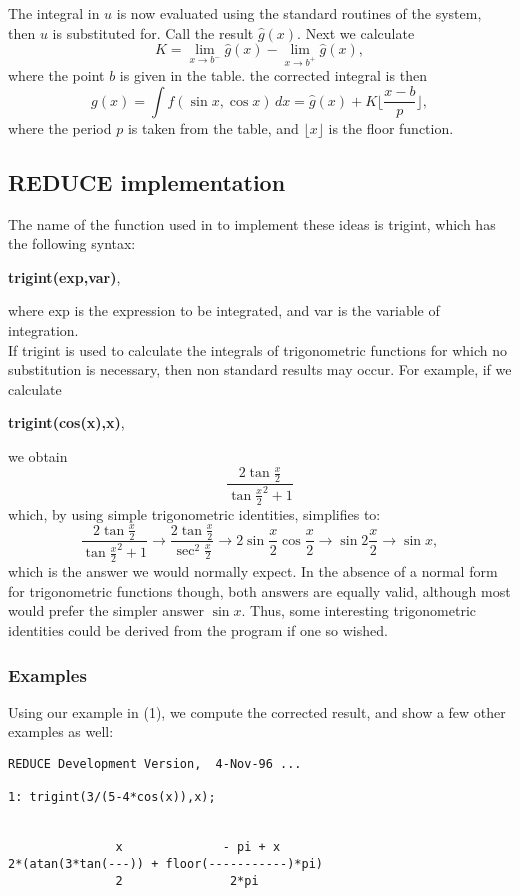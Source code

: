 The integral in $u$ is now evaluated using the standard routines of the system, then $u$ is substituted for. Call the result $\hat{g}(x)$. Next we calculate
 \[ K=\lim_{x \rightarrow b^{-}} \hat{g}(x) - \lim_{x \rightarrow b^{+}} \hat{g}(x), \]
where the point $b$ is given in the table. the corrected integral is then
\[ g(x)=\int f(\sin x,\cos x)\,dx = \hat{g}(x)+K\lfloor \frac{x-b}{p} \rfloor, \]
where the period $p$ is taken from the table, and $\lfloor x \rfloor$ is the floor function.

\subsection{REDUCE implementation}
The name of the function used in \REDUCE to implement these ideas is trigint, which has the following syntax:
\begin{center}  \textbf{trigint(exp,var)}, \end{center}
where exp is the expression to be integrated, and var is the variable of integration.  \\
If trigint is used to calculate the integrals of trigonometric functions for which no substitution is necessary, then non standard results may occur. For example, if we calculate
  \begin{center} \textbf{trigint(cos(x),x)}, \end{center}
we obtain
\[ \frac{2\tan\frac{x}{2}}{\tan\frac{x}{2}^{2}+1} \]
which, by using simple trigonometric identities, simplifies to:
\[  \frac{2\tan\frac{x}{2}}{\tan\frac{x}{2}^{2}+1} \rightarrow \frac{2\tan\frac{x}{2}}{\sec^{2}\frac{x}{2}} \rightarrow 2\sin\frac{x}{2}\cos\frac{x}{2} \rightarrow \sin 2\frac{x}{2} \rightarrow \sin x, \]
which is the answer we would normally expect. In the absence of a normal form for trigonometric functions though, both answers are equally valid, although most would prefer the simpler answer $\sin x$. Thus, some interesting trigonometric identities could be derived from the program if one so wished.
\subsubsection{Examples}
Using our example in (1), we compute the corrected result, and show a few other examples as well:
\begin{verbatim}
REDUCE Development Version,  4-Nov-96 ...

1: trigint(3/(5-4*cos(x)),x);


               x              - pi + x
2*(atan(3*tan(---)) + floor(-----------)*pi)
               2               2*pi
\end{verbatim}


